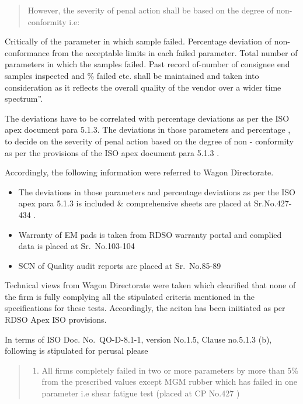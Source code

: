 \documentclass[nofonts,]{tufte-book}
\providecommand{\tightlist}{%
  \setlength{\itemsep}{0pt}\setlength{\parskip}{0pt}}
\begin{document}
\begin{quote}
However, the severity of penal action shall be based on the degree of
non-conformity i.e:
\end{quote}

Critically of the parameter in which sample failed. Percentage deviation
of non-conformance from the acceptable limits in each failed parameter.
Total number of parameters in which the samples failed. Past record
of-number of consignee end samples inspected and \% failed etc. shall be
maintained and taken into consideration as it reflects the overall
quality of the vendor over a wider time spectrum''.

The deviations have to be correlated with percentage deviations as per
the ISO apex document para 5.1.3. The deviations in those parameters and
percentage , to decide on the severity of penal action based on the
degree of non - conformity as per the provisions of the ISO apex
document para 5.1.3 .

Accordingly, the following information were referred to Wagon
Directorate.

\begin{itemize}
\item
  The deviations in those parameters and percentage deviations as per
  the ISO apex para 5.1.3 is included \& comprehensive sheets are placed
  at Sr.No.427-434 .
\item
  Warranty of EM pads is taken from RDSO warranty portal and complied
  data is placed at Sr.~No.103-104
\item
  SCN of Quality audit reports are placed at Sr.~No.85-89
\end{itemize}

Technical views from Wagon Directorate were taken which clearified that
none of the firm is fully complying all the stipulated criteria
mentioned in the specifications for these tests. Accordingly, the aciton
has been iniitiated as per RDSO Apex ISO provisions.

In terms of ISO Doc. No.~QO-D-8.1-1, version No.1.5, Clause no.5.1.3
(b), following is stipulated for perusal please

\begin{quote}
\begin{enumerate}
\def\labelenumi{(\roman{enumi})}
\tightlist
\item
  All firms completely failed in two or more parameters by more than 5\%
  from the prescribed values except MGM rubber which has failed in one
  parameter i.e shear fatigue test (placed at CP No.427 )
\end{enumerate}
\end{quote}
\end{document}
